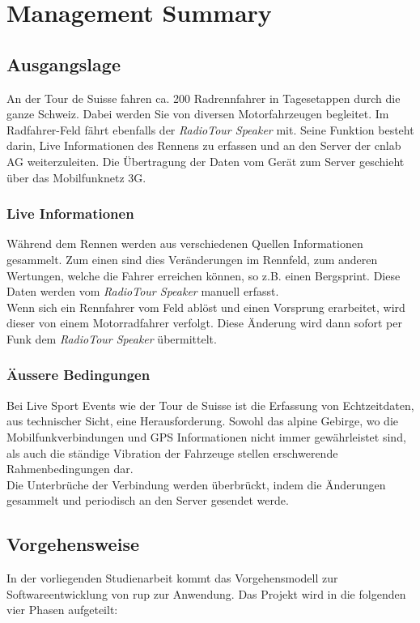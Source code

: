 \chapter*{Management Summary}

\section*{Ausgangslage}
An der Tour de Suisse fahren ca. 200 Radrennfahrer in Tagesetappen durch die ganze Schweiz. Dabei werden Sie von diversen Motorfahrzeugen begleitet. Im Radfahrer-Feld fährt ebenfalls der \textit{RadioTour Speaker} mit. Seine Funktion besteht darin, Live Informationen des Rennens zu erfassen und an den Server der cnlab AG weiterzuleiten.  Die Übertragung der Daten vom Gerät zum Server geschieht über das Mobilfunknetz 3G.

\subsection*{Live Informationen}
Während dem Rennen werden aus verschiedenen Quellen Informationen gesammelt. Zum einen sind dies Veränderungen im Rennfeld, zum anderen Wertungen, welche die Fahrer erreichen können, so z.B. einen Bergsprint. Diese Daten werden vom \textit{RadioTour Speaker} manuell erfasst.
\\
Wenn sich ein Rennfahrer vom Feld ablöst und einen Vorsprung erarbeitet, wird dieser von einem Motorradfahrer verfolgt. Diese Änderung wird dann sofort per Funk dem \textit{RadioTour Speaker} übermittelt.

\subsection*{Äussere Bedingungen}
Bei Live Sport Events wie der Tour de Suisse ist die Erfassung von Echtzeitdaten, aus technischer Sicht, eine Herausforderung. Sowohl das alpine Gebirge, wo die Mobilfunkverbindungen und GPS Informationen nicht immer gewährleistet sind, als auch die ständige Vibration der Fahrzeuge stellen erschwerende Rahmenbedingungen dar.
\\
Die Unterbrüche der Verbindung werden überbrückt, indem die Änderungen gesammelt und periodisch an den Server gesendet werde.

\newpage

\section*{Vorgehensweise}
In der vorliegenden Studienarbeit kommt das Vorgehensmodell zur Softwareentwicklung von \gls{rup} zur Anwendung. Das Projekt wird in die folgenden vier Phasen aufgeteilt:

